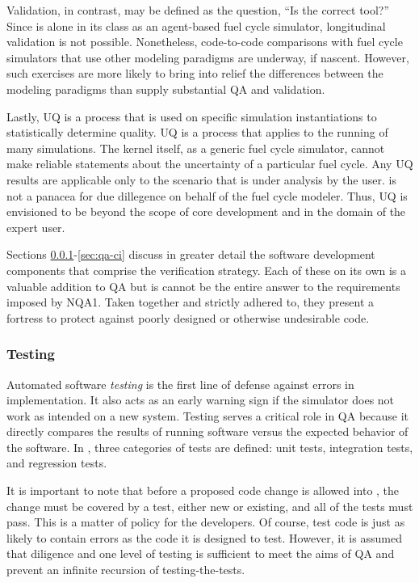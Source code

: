 Validation, in contrast,  may be defined as the question, 
``Is \Cyclus the correct tool?''
Since \Cyclus is alone in its class as an agent-based fuel cycle simulator, longitudinal 
validation is not possible. Nonetheless, code-to-code comparisons with fuel cycle
simulators that use other modeling paradigms are underway, if nascent. However, such 
exercises are more likely to bring into relief the differences between the modeling
paradigms than supply substantial \gls{QA} and validation. 

Lastly, \gls{UQ} is a process that is used on specific simulation
instantiations to statistically determine quality. \gls{UQ} is a process that applies 
to the running of many \Cyclus simulations. The kernel itself, as a generic fuel cycle 
simulator, cannot make reliable statements about the uncertainty of a particular fuel 
cycle. Any \gls{UQ} results are applicable only to the scenario that is under 
analysis by the user. \Cyclus is not a panacea for due dillegence on behalf of the fuel 
cycle modeler. Thus, \gls{UQ} is envisioned to be beyond the scope of core development 
and in the domain of the expert user.

Sections \ref{sec:qa-testing}-\ref{sec:qa-ci} discuss in greater detail the software 
development components that comprise the \Cyclus verification strategy.
Each of these on its own is a valuable addition to \gls{QA} but is cannot be the 
entire answer to the requirements imposed by \gls{NQA1}. Taken together and strictly 
adhered to, they present a fortress to protect against poorly designed or otherwise undesirable code.


\subsubsection{Testing}
\label{sec:qa-testing}

Automated software \emph{testing} is the first line of defense against
errors in implementation. It also acts as an early warning sign if the
simulator does not work as intended on a new system.
Testing serves a critical role in \gls{QA} because it directly compares the 
results of running software versus the expected behavior of the software.
In \Cyclus, three categories of tests are defined: unit tests, integration 
tests, and regression tests. 

It is important to note that before a proposed
code change is allowed into \Cyclus,  the change must be covered by a test, either new or existing, and all of the tests must pass.  This is a
matter of policy for the developers. Of course, test code is 
just as likely to contain errors as the code it is designed to test. 
However, it is assumed that diligence and one level of testing 
is sufficient to meet the aims of \gls{QA} and prevent an infinite recursion
of testing-the-tests.

